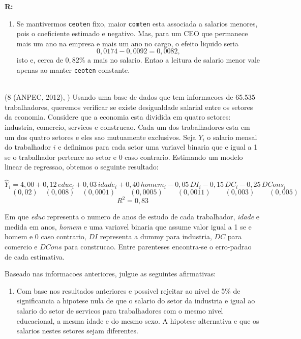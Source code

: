 \documentclass[12pt,letterpaper, onecolumn]{exam}
\renewenvironment{solution}
  {\par\noindent\textbf{R:}\enspace\color{blue}}
  {\par\color{black}}
\begin{document}
\begin{questions}
\begin{solution}
\begin{enumerate}[label=(\roman*)]
    \item Se mantivermos \texttt{ceoten} fixo, maior \texttt{comten} esta associada a salarios menores, pois o coeficiente estimado e negativo. Mas, para um CEO que permanece mais um ano na empresa e mais um ano no cargo, o efeito liquido seria
    \[
    0,0174 - 0,0092 = 0,0082,
    \]
    isto e, cerca de \(0,82\%\) a mais no salario. Entao a leitura de salario menor vale apenas ao manter \texttt{ceoten} constante.
\end{enumerate}
\end{solution}

\
\
\\

\question (8 (ANPEC, 2012), \citep{pereda_denisard}) Usando uma base de dados que tem informacoes de 65.535 trabalhadores, queremos verificar se existe desigualdade salarial entre os setores da economia. Considere que a economia esta dividida em quatro setores: industria, comercio, servicos e construcao. Cada um dos trabalhadores esta em um dos quatro setores e eles sao mutuamente exclusivos. Seja \(Y_i\) o salario mensal do trabalhador \(i\) e definimos para cada setor uma variavel binaria que e igual a 1 se o trabalhador pertence ao setor e 0 caso contrario. Estimando um modelo linear de regressao, obtemos o seguinte resultado:

\[
\hat{Y}_i = 4{,}00 + 0{,}12\,educ_i + 0{,}03\,idade_i + 0{,}40\,homem_i - 0{,}05\,DI_i - 0{,}15\,DC_i - 0{,}25\,DCons_i
\]
\vspace{-0.8cm}
\[
\quad (0{,}02)\quad (0{,}008)\quad (0{,}0001)\qquad (0{,}0005)\qquad (0{,}0011)\qquad (0{,}003)\qquad (0{,}005)
\]
\[
R^2 = 0{,}83
\]

Em que \textit{educ} representa o numero de anos de estudo de cada trabalhador, \textit{idade} e medida em anos, \textit{homem} e uma variavel binaria que assume valor igual a 1 se e homem e 0 caso contrario, \(DI\) representa a dummy para industria, \(DC\) para comercio e \(DCons\) para construcao. Entre parenteses encontra-se o erro-padrao de cada estimativa.

Baseado nas informacoes anteriores, julgue as seguintes afirmativas:

\begin{enumerate}[label=(\arabic*)]
    \item Com base nos resultados anteriores e possivel rejeitar ao nivel de 5\% de significancia a hipotese nula de que o salario do setor da industria e igual ao salario do setor de servicos para trabalhadores com o mesmo nivel educacional, a mesma idade e do mesmo sexo. A hipotese alternativa e que os salarios nestes setores sejam diferentes.


\end{enumerate}
\end{questions}
\end{document}
